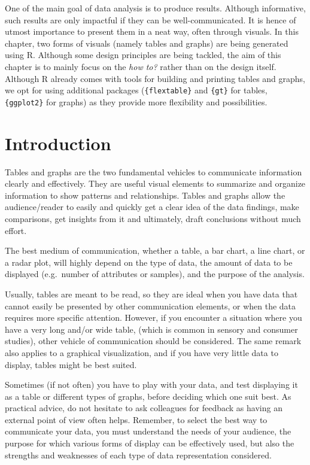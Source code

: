 \documentclass[
]{krantz}
\renewenvironment{quote}{\begin{VF}}{\end{VF}}
\begin{document}
\begin{quote}
One of the main goal of data analysis is to produce results. Although informative, such results are only impactful if they can be well-communicated. It is hence of utmost importance to present them in a neat way, often through visuals.
In this chapter, two forms of visuals (namely tables and graphs) are being generated using R. Although some design principles are being tackled, the aim of this chapter is to mainly focus on the \emph{how to?} rather than on the design itself.
Although R already comes with tools for building and printing tables and graphs, we opt for using additional packages (\texttt{\{flextable\}} and \texttt{\{gt\}} for tables, \texttt{\{ggplot2\}} for graphs) as they provide more flexibility and possibilities.
\end{quote}

\hypertarget{introduction}{%
\section{Introduction}\label{introduction}}

Tables and graphs are the two fundamental vehicles to communicate information clearly and effectively. They are useful visual elements to summarize and organize information to show patterns and relationships. Tables and graphs allow the audience/reader to easily and quickly get a clear idea of the data findings, make comparisons, get insights from it and ultimately, draft conclusions without much effort.

The best medium of communication, whether a table, a bar chart, a line chart, or a radar plot, will highly depend on the type of data, the amount of data to be displayed (e.g.~number of attributes or samples), and the purpose of the analysis.

Usually, tables are meant to be read, so they are ideal when you have data that cannot easily be presented by other communication elements, or when the data requires more specific attention. However, if you encounter a situation where you have a very long and/or wide table, (which is common in sensory and consumer studies), other vehicle of communication should be considered. The same remark also applies to a graphical visualization, and if you have very little data to display, tables might be best suited.

Sometimes (if not often) you have to play with your data, and test displaying it as a table or different types of graphs, before deciding which one suit best. As practical advice, do not hesitate to ask colleagues for feedback as having an external point of view often helps. Remember, to select the best way to communicate your data, you must understand the needs of your audience, the purpose for which various forms of display can be effectively used, but also the strengths and weaknesses of each type of data representation considered.
\end{document}
